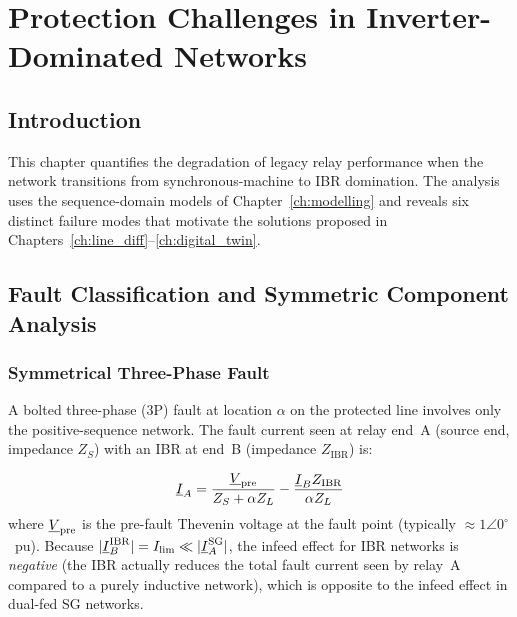 \chapter{Protection Challenges in Inverter-Dominated Networks}
\label{ch:challenges}

\section{Introduction}

This chapter quantifies the degradation of legacy relay performance when
the network transitions from synchronous-machine to IBR domination.
The analysis uses the sequence-domain models of Chapter~\ref{ch:modelling}
and reveals six distinct failure modes that motivate the solutions proposed
in Chapters~\ref{ch:line_diff}--\ref{ch:digital_twin}.

\section{Fault Classification and Symmetric Component Analysis}
\label{sec:ch3_faults}

\subsection{Symmetrical Three-Phase Fault}

A bolted three-phase (3P) fault at location $\alpha$ on the protected line
involves only the positive-sequence network. The fault current seen at
relay end~A (source end, impedance $Z_S$) with an IBR at end~B
(impedance $Z_\mathrm{IBR}$) is:

\begin{equation}
  \underline{I}_A = \frac{\underline{V}_\mathrm{pre}}{Z_S + \alpha Z_L}
    - \frac{\underline{I}_B Z_\mathrm{IBR}}{\alpha Z_L}
  \label{eq:ch3_3p_ia}
\end{equation}
where $\underline{V}_\mathrm{pre}$ is the pre-fault Thevenin voltage at the
fault point (typically $\approx 1\angle 0^\circ$~pu). Because
$|\underline{I}_B^\mathrm{IBR}| = I_\mathrm{lim} \ll |\underline{I}_A^\mathrm{SG}|$,
the infeed effect for IBR networks is \emph{negative} (the IBR actually
reduces the total fault current seen by relay~A compared to a purely
inductive network), which is opposite to the infeed effect in dual-fed SG
networks.

